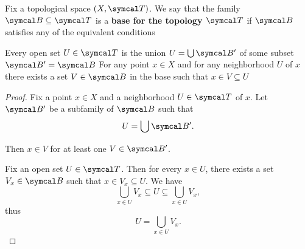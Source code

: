 \begin{definition}\label{def:topological_base}\cite[12]{Engelking1989}
  Fix a topological space \( (X, \Cal{T}) \). We say that the family \( \Cal{B} \subseteq \Cal{T} \) is a \textbf{base for the topology \( \Cal{T} \)} if \( \Cal{B} \) satisfies any of the equivalent conditions
  \begin{defenum}
     Every open set \( U \in \Cal{T} \) is the union \( U = \bigcup \Cal{B}' \) of some subset \( \Cal{B}' = \Cal{B} \)
     For any point \( x \in X \) and for any neighborhood \( U \) of \( x \) there exists a set \( V \in \Cal{B} \) in the base such that \( x \in V \subseteq U \)
  \end{defenum}
\end{definition}
\begin{proof}
   Fix a point \( x \in X \) and a neighborhood \( U \in \Cal{T} \) of \( x \). Let \( \Cal{B}' \) be a subfamily of \( \Cal{B} \) such that
  \begin{equation*}
    U = \bigcup \Cal{B}'.
  \end{equation*}

  Then \( x \in V \) for at least one \( V \in \Cal{B}' \).

   Fix an open set \( U \in \Cal{T} \). Then for every \( x \in U \), there exists a set \( V_x \in \Cal{B} \) such that \( x \in V_x \subseteq U \). We have
  \begin{equation*}
    \bigcup_{x \in U} V_x \subseteq U \subseteq \bigcup_{x \in U} V_x,
  \end{equation*}
  thus
  \begin{equation*}
    U = \bigcup_{x \in U} V_x.
  \end{equation*}
\end{proof}

